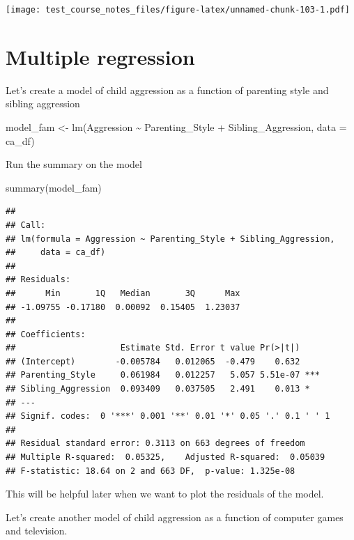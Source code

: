 \documentclass[
]{book}
\newenvironment{Shaded}{\begin{snugshade}}{\end{snugshade}}
\newcommand{\AttributeTok}[1]{\textcolor[rgb]{0.77,0.63,0.00}{#1}}
\newcommand{\FunctionTok}[1]{\textcolor[rgb]{0.00,0.00,0.00}{#1}}
\newcommand{\NormalTok}[1]{#1}
\newcommand{\OtherTok}[1]{\textcolor[rgb]{0.56,0.35,0.01}{#1}}
\newcommand{\SpecialCharTok}[1]{\textcolor[rgb]{0.00,0.00,0.00}{#1}}
\begin{document}
\texttt{[image: test\_course\_notes\_files/figure-latex/unnamed-chunk-103-1.pdf]}

\hypertarget{multiple-regression}{%
\section{Multiple regression}\label{multiple-regression}}

Let's create a model of child aggression as a function of parenting style and sibling aggression

\begin{Shaded}
\begin{Highlighting}[]
\NormalTok{model\_fam }\OtherTok{\textless{}{-}} \FunctionTok{lm}\NormalTok{(Aggression }\SpecialCharTok{\textasciitilde{}}\NormalTok{ Parenting\_Style }\SpecialCharTok{+}\NormalTok{ Sibling\_Aggression, }\AttributeTok{data =}\NormalTok{ ca\_df)}
\end{Highlighting}
\end{Shaded}

Run the summary on the model

\begin{Shaded}
\begin{Highlighting}[]
\FunctionTok{summary}\NormalTok{(model\_fam)}
\end{Highlighting}
\end{Shaded}

\begin{verbatim}
## 
## Call:
## lm(formula = Aggression ~ Parenting_Style + Sibling_Aggression, 
##     data = ca_df)
## 
## Residuals:
##      Min       1Q   Median       3Q      Max 
## -1.09755 -0.17180  0.00092  0.15405  1.23037 
## 
## Coefficients:
##                     Estimate Std. Error t value Pr(>|t|)    
## (Intercept)        -0.005784   0.012065  -0.479    0.632    
## Parenting_Style     0.061984   0.012257   5.057 5.51e-07 ***
## Sibling_Aggression  0.093409   0.037505   2.491    0.013 *  
## ---
## Signif. codes:  0 '***' 0.001 '**' 0.01 '*' 0.05 '.' 0.1 ' ' 1
## 
## Residual standard error: 0.3113 on 663 degrees of freedom
## Multiple R-squared:  0.05325,    Adjusted R-squared:  0.05039 
## F-statistic: 18.64 on 2 and 663 DF,  p-value: 1.325e-08
\end{verbatim}

This will be helpful later when we want to plot the residuals of the model.

Let's create another model of child aggression as a function of computer games and television.
\end{document}
